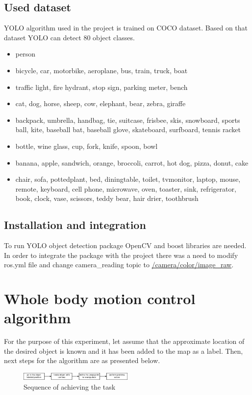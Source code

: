 \documentclass[conference,a4paper]{IEEEtran}
\begin{document}
\subsection{Used dataset}
YOLO algorithm used in the project is trained on COCO dataset. Based on that dataset YOLO can detect 80 object classes.
\begin{itemize}
\item person
\item bicycle, car, motorbike, aeroplane, bus, train, truck, boat
\item traffic light, fire hydrant, stop sign, parking meter, bench
\item cat, dog, horse, sheep, cow, elephant, bear, zebra, giraffe
\item backpack, umbrella, handbag, tie, suitcase, frisbee, skis, snowboard, sports ball, kite, baseball bat, baseball glove, skateboard, surfboard, tennis racket
\item bottle, wine glass, cup, fork, knife, spoon, bowl
\item banana, apple, sandwich, orange, broccoli, carrot, hot dog, pizza, donut, cake
\item chair, sofa, pottedplant, bed, diningtable, toilet, tvmonitor, laptop, mouse, remote, keyboard, cell phone, microwave, oven, toaster, sink, refrigerator, book, clock, vase, scissors, teddy bear, hair drier, toothbrush
\end{itemize}

\subsection{Installation and integration}
To run YOLO object detection package OpenCV and boost libraries are needed. In order to integrate the package with the project there was a need to modify ros.yml file and change camera\_reading topic to \url{/camera/color/image_raw}. 

\section{Whole body motion control algorithm}
For the purpose of this experiment, let assume that the approximate location of the desired object is known and it has been added to the map as a label. Then, next steps for the algorithm are as presented below.

\begin{figure}[ht]
  \centering
  \includegraphics[width=0.5\textwidth]{img/algorithm_no_problem.png}
  \caption{Sequence of achieving the task}
\end{figure}
\end{document}
